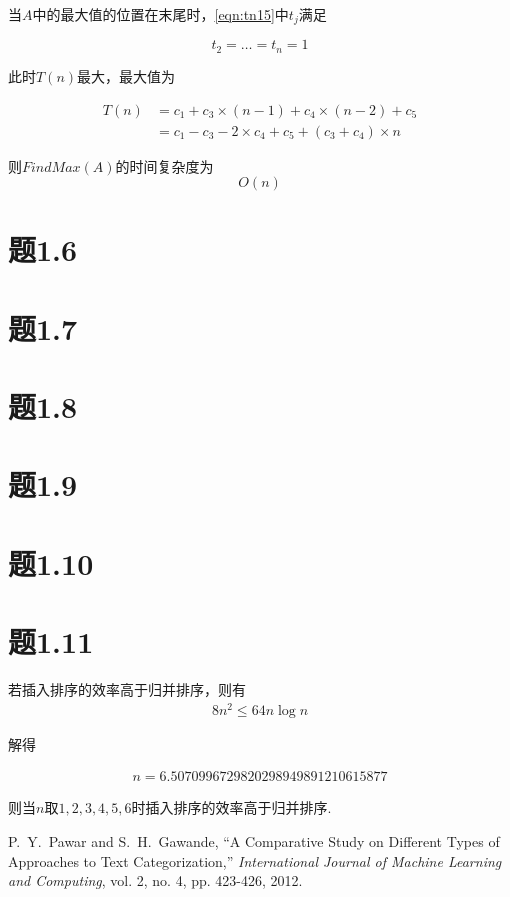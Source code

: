 \documentclass[a4paper,twoside]{article}
\begin{document}
\begin{spacing}{1.2}
当$A$中的最大值的位置在末尾时，\eqref{eqn:tn15}中$t_j$满足

$$
t_2=\dots=t_n=1
$$

此时$T(n)$最大，最大值为

\begin{align*}
T(n) & =c_1 + c_3 \times (n-1) + c_4 \times (n-2) + c_5 \\
& = c_1 - c_3 - 2 \times c_4 +c_5 + (c_3+c_4) \times n  
\end{align*}

则$FindMax(A)$的时间复杂度为
$$
O(n)
$$

\section{题1.6}

\section{题1.7}

\section{题1.8}

\section{题1.9}

\section{题1.10}

\section{题1.11}
若插入排序的效率高于归并排序，则有
\begin{align*}
	8n^2 \le 64n \log n
\end{align*}

解得

\begin{align*}
	n = 6.5070996729820298949891210615877
\end{align*}

则当$n$取$1,2,3,4,5,6$时插入排序的效率高于归并排序.

\newpage
\begin{thebibliography}{00}
	
	
	P.~Y.~Pawar and S.~H.~Gawande, ``A Comparative Study on Different Types of Approaches to Text Categorization,'' \textit{International Journal of Machine Learning and Computing}, vol. 2, no. 4, pp. 423-426, 2012.

	
\end{thebibliography}


\addtocounter{page}{-1}
\thispagestyle{empty}

\end{spacing}
\end{document}
